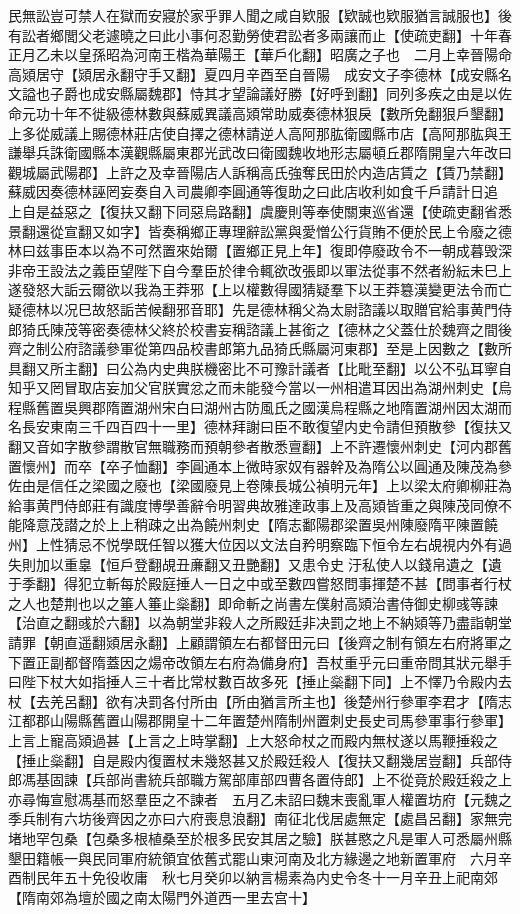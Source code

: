 民無訟豈可禁人在獄而安寢於家乎罪人聞之咸自欵服【欵誠也欵服猶言誠服也】後有訟者鄉閭父老遽曉之曰此小事何忍勤勞使君訟者多兩讓而止【使疏吏翻】十年春正月乙未以皇孫昭為河南王楷為華陽王【華戶化翻】昭廣之子也　二月上幸晉陽命高熲居守【熲居永翻守手又翻】夏四月辛酉至自晉陽　成安文子李德林【成安縣名文謚也子爵也成安縣屬魏郡】恃其才望論議好勝【好呼到翻】同列多疾之由是以佐命元功十年不徙級德林數與蘇威異議高熲常助威奏德林狠戾【數所免翻狠戶墾翻】上多從威議上賜德林莊店使自擇之德林請逆人高阿那肱衛國縣市店【高阿那肱與王謙舉兵誅衛國縣本漢觀縣屬東郡光武改曰衛國魏收地形志屬頓丘郡隋開皇六年改曰觀城屬武陽郡】上許之及幸晉陽店人訴稱高氏強奪民田於内造店賃之【賃乃禁翻】蘇威因奏德林誣罔妄奏自入司農卿李圓通等復助之曰此店收利如食千戶請計日追上自是益惡之【復扶又翻下同惡烏路翻】虞慶則等奉使關東巡省還【使疏吏翻省悉景翻還從宣翻又如字】皆奏稱鄉正專理辭訟黨與愛憎公行貨賄不便於民上令廢之德林曰兹事臣本以為不可然置來始爾【置鄉正見上年】復即停廢政令不一朝成暮毁深非帝王設法之義臣望陛下自今羣臣於律令輒欲改張即以軍法從事不然者紛紜未巳上遂發怒大詬云爾欲以我為王莽邪【上以權數得國猜疑羣下以王莽簒漢變更法令而亡疑德林以况巳故怒詬苦候翻邪音耶】先是德林稱父為太尉諮議以取贈官給事黄門侍郎猗氏陳茂等密奏德林父終於校書妄稱諮議上甚銜之【德林之父蓋仕於魏齊之間後齊之制公府諮議參軍從第四品校書郎第九品猗氏縣屬河東郡】至是上因數之【數所具翻又所主翻】曰公為内史典朕機密比不可豫計議者【比毗至翻】以公不弘耳寧自知乎又罔冒取店妄加父官朕實忿之而未能發今當以一州相遣耳因出為湖州刺史【烏程縣舊置吳興郡隋置湖州宋白曰湖州古防風氏之國漢烏程縣之地隋置湖州因太湖而名長安東南三千四百四十一里】德林拜謝曰臣不敢復望内史令請但預散參【復扶又翻又音如字散參謂散官無職務而預朝參者散悉亶翻】上不許遷懷州刺史【河内郡舊置懷州】而卒【卒子恤翻】李圓通本上微時家奴有器幹及為隋公以圓通及陳茂為參佐由是信任之梁國之廢也【梁國廢見上卷陳長城公禎明元年】上以梁太府卿柳莊為給事黄門侍郎莊有識度博學善辭令明習典故雅達政事上及高熲皆重之與陳茂同僚不能降意茂譛之於上上稍疎之出為饒州刺史【隋志鄱陽郡梁置吳州陳廢隋平陳置饒州】上性猜忌不悦學既任智以獲大位因以文法自矜明察臨下恒令左右覘視内外有過失則加以重辠【恒戶登翻覘丑亷翻又丑艷翻】又患令史汙私使人以錢帛遺之【遺于季翻】得犯立斬每於殿庭捶人一日之中或至數四嘗怒問事揮楚不甚【問事者行杖之人也楚荆也以之箠人箠止橤翻】即命斬之尚書左僕射高熲治書侍御史柳彧等諫【治直之翻彧於六翻】以為朝堂非殺人之所殿廷非决罰之地上不納熲等乃盡詣朝堂請罪【朝直遥翻熲居永翻】上顧謂領左右都督田元曰【後齊之制有領左右府將軍之下置正副都督隋蓋因之煬帝改領左右府為備身府】吾杖重乎元曰重帝問其狀元舉手曰陛下杖大如指捶人三十者比常杖數百故多死【捶止橤翻下同】上不懌乃令殿内去杖【去羌呂翻】欲有决罰各付所由【所由猶言所主也】後楚州行參軍李君才【隋志江都郡山陽縣舊置山陽郡開皇十二年置楚州隋制州置刺史長史司馬參軍事行參軍】上言上寵高熲過甚【上言之上時掌翻】上大怒命杖之而殿内無杖遂以馬鞭捶殺之【捶止橤翻】自是殿内復置杖未幾怒甚又於殿廷殺人【復扶又翻幾居豈翻】兵部侍郎馮基固諫【兵部尚書統兵部職方駕部庫部四曹各置侍郎】上不從竟於殿廷殺之上亦尋悔宣慰馮基而怒羣臣之不諫者　五月乙未詔曰魏末喪亂軍人權置坊府【元魏之季兵制有六坊後齊因之亦曰六府喪息浪翻】南征北伐居處無定【處昌呂翻】家無完堵地罕包桑【包桑多根植桑至於根多民安其居之驗】朕甚愍之凡是軍人可悉屬州縣墾田籍帳一與民同軍府統領宜依舊式罷山東河南及北方緣邊之地新置軍府　六月辛酉制民年五十免役收庸　秋七月癸卯以納言楊素為内史令冬十一月辛丑上祀南郊【隋南郊為壇於國之南太陽門外道西一里去宫十】

